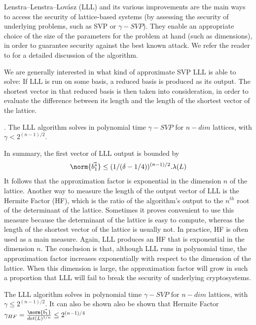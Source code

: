 Lenstra–Lenstra–Lovász (LLL) and its various improvements are the main ways to
access the security of lattice-based systems (by assessing the security of
underlying problems, such as SVP or $\gamma-SVP$). They enable an appropriate choice of the size of the parameters for the problem at hand (such as dimensions), in order
to guarantee security against the best known attack. We refer the reader to \cite{nguyen2009lll} for a detailed discussion of the algorithm.

We are generally interested in what kind of
approximate SVP LLL is able to solve: If LLL is run on some basis, a
reduced basis is produced as its output. The shortest vector in that reduced basis is then taken into consideration, in order to evaluate the difference between its length and the length of the shortest vector of the lattice.
\begin{theorem}
  . The LLL algorithm solves in polynomial time
  $\gamma-SVP$ for $n-dim$ lattices, with $\gamma < 2^{(n-1)/2}$.
  \label{theo:LLLShortVector}
\end{theorem}

In summary, the first vector of LLL output is bounded by
\[
  \norm{\vec{b_1^*}} \leq (1/(\delta-1/4))^{(n-1)/2}.\lambda(L)
\]
It follows that the approximation factor is exponential in the dimension $n$ of
the lattice. Another way to measure the length of the output vector of LLL is
the Hermite Factor (HF), which is the ratio of the algorithm's output to the
$n^{th}$ root of the determinant of the lattice. Sometimes it proves convenient
to use this measure because the determinant of the lattice is easy to compute,
whereas the length of the shortest vector of the lattice is usually not. In
practice, HF is often used as a main measure. Again, LLL produces an HF that is
exponential in the dimension $n$. The conclusion is that, although LLL runs in
polynomial time, the approximation factor increases exponentially with respect
to the dimension of the lattice. When this dimension is large, the approximation
factor will grow in such a proportion that LLL will fail to break the security
of underlying cryptosystems.
\begin{theorem}
  The LLL algorithm solves in polynomial time $\gamma-SVP$ for $n-dim$ lattices,
  with $\gamma \leq 2^{(n-1)/2}$. It can also be shown also be shown that Hermite Factor
  $\gamma_{HF} = \frac{\norm{\vec{b_1}}}{det(L)^{1/n}} \leq 2^{(n-1)/4}$
  \label{theo:LLLHF}
\end{theorem}



